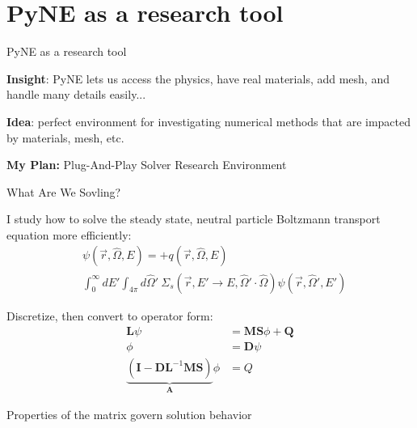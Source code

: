 \documentclass[xcolor=x11names,compress]{beamer}
\renewcommand{\(}{\begin{columns}}
\renewcommand{\)}{\end{columns}}
\newcommand{\<}[1]{\begin{column}{#1}}
\renewcommand{\>}{\end{column}}
\newcommand{\Macro}{\ensuremath{\Sigma}}
\newcommand{\vOmega}{\ensuremath{\hat{\Omega}}}
\newcommand{\ve}[1]{\ensuremath{\mathbf{#1}}}
\begin{document}
\section{PyNE as a research tool}  
\begin{frame}{PyNE as a research tool}

    \textbf{Insight}: PyNE lets us access the physics, have real materials, 
    add mesh, and handle many details easily...
    
    	\pause
    \vspace{2 em}
    \textbf{Idea}: perfect environment for investigating numerical methods that 
    are impacted by materials, mesh, etc. 
    
    	\pause
    \vspace{2 em}
    \textbf{My Plan:} Plug-And-Play Solver Research Environment
    
\end{frame}

\begin{frame}{What Are We Sovling?}

    I study how to solve the steady state, neutral particle Boltzmann transport equation
    more efficiently:
    \begin{align}
    [\vOmega \cdot \nabla + \Macro(\vec{r}, E)] &\psi(\vec{r}, \vOmega, E)  =  + q(\vec{r}, \vOmega, E) \nonumber\\
     &\int_0^{\infty} dE' \int_{4\pi} d\vOmega' \:\Macro_{s}(\vec{r}, E' \to E,
     \vOmega' \cdot \vOmega) \psi(\vec{r}, \vOmega', E') \nonumber
    \end{align}

    Discretize, then convert to operator form:
    \begin{align}
    \mathbf{L} \psi &= \mathbf{MS}\phi + \mathbf{Q} \nonumber\\
    \phi &= \mathbf{D}\psi \nonumber \\
    \underbrace{(\ve{I} - \ve{DL}^{-1}\ve{MS})}_{\mathbf{A}}\phi &= Q\nonumber
    \end{align}
    
    Properties of the matrix govern solution behavior
    
\end{frame}
\end{document}
